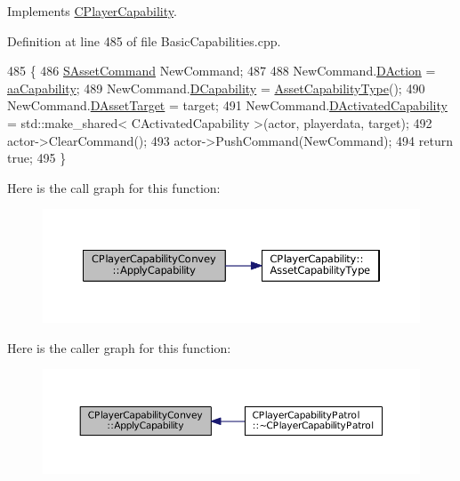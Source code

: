 Implements \hyperlink{classCPlayerCapability_a2ca6fd7fbd9c0178f1cf1d049c63825f}{C\+Player\+Capability}.



Definition at line 485 of file Basic\+Capabilities.\+cpp.


\begin{DoxyCode}
485                                                                                                            
                                                          \{
486     \hyperlink{structSAssetCommand}{SAssetCommand} NewCommand;
487     
488     NewCommand.\hyperlink{structSAssetCommand_a8edd3b3d59a76d5514ba403bc8076a75}{DAction} = \hyperlink{GameDataTypes_8h_ab47668e651a3032cfb9c40ea2d60d670acf9fb164e8abd71c71f4a8c7fda360d4}{aaCapability};
489     NewCommand.\hyperlink{structSAssetCommand_a734ea7c6847457b437360f333f570ff9}{DCapability} = \hyperlink{classCPlayerCapability_a433bb196cd6ab6a932f1cac102b3aa98}{AssetCapabilityType}();
490     NewCommand.\hyperlink{structSAssetCommand_a3d9b43f6e59c386c48c41a65448a0c39}{DAssetTarget} = target;
491     NewCommand.\hyperlink{structSAssetCommand_ad8beda19520811cc70fe1eab16c774dd}{DActivatedCapability} = std::make\_shared< CActivatedCapability >(actor, 
      playerdata, target);
492     actor->ClearCommand();
493     actor->PushCommand(NewCommand);
494     \textcolor{keywordflow}{return} \textcolor{keyword}{true};
495 \}
\end{DoxyCode}
Here is the call graph for this function\+:\nopagebreak
\begin{figure}[H]
\begin{center}
\leavevmode
\includegraphics[width=350pt]{classCPlayerCapabilityConvey_ad05e5ab950872e685fb9449592f7f5a9_cgraph}
\end{center}
\end{figure}
Here is the caller graph for this function\+:\nopagebreak
\begin{figure}[H]
\begin{center}
\leavevmode
\includegraphics[width=350pt]{classCPlayerCapabilityConvey_ad05e5ab950872e685fb9449592f7f5a9_icgraph}
\end{center}
\end{figure}
\hypertarget{classCPlayerCapabilityConvey_a795b3eb4c3879a6d7da1cba7962a1c78}{}\label{classCPlayerCapabilityConvey_a795b3eb4c3879a6d7da1cba7962a1c78} 
